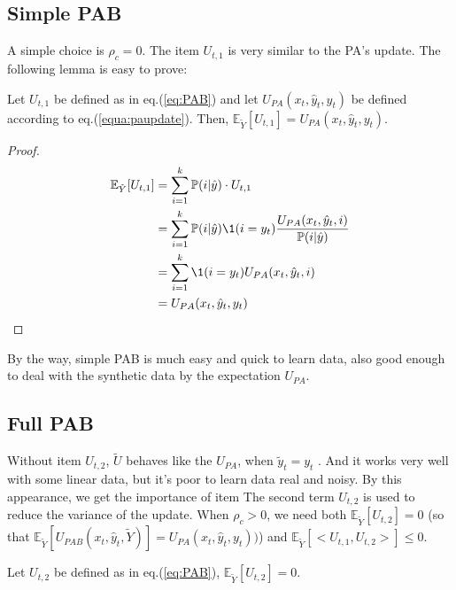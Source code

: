 
\subsection{Simple PAB}
\label{subsec:SPAB}
A simple choice is $\rho_c = 0$. 
The item $U_{t,1}$ is very similar to the PA's update. The following lemma is easy to prove:
\begin{lema} 
\label{lema:pab1}
Let $U_{t,1}$ be  defined as in eq.(\ref{eq:PAB}) and let $U_{PA}(x_t,\hat{y}_t,y_t)$ 
be defined according to eq.(\ref{equa:paupdate}). Then, $\mathbb{E}_{\tilde{Y}}[U_{t,1}]=U_{PA}(x_t,\hat{y}_t,y_t)$.
\end{lema}
\begin{proof}
\begin{align*}
\mathbb{E}_{\tilde{Y}}[U_{t,1}] &= \sum_{i=1}^{k}  \mathbb{P}(i|\hat{y})\cdot U_{t,1}\\
&=\sum_{i=1}^{k}\mathbb{P}(i|\hat{y})\1(i=y_t)\frac{U_{PA}(x_t,\hat{y}_t,i)}{\mathbb{P}(i|\hat{y})}\\
&=\sum_{i=1}^{k} \1(i=y_t)U_{PA}(x_t,\hat{y}_t,i) \\
&=U_{PA}(x_t,\hat{y}_t,y_t)
\end{align*}
\end{proof}
By the way, simple PAB is much easy and quick to learn data, also good enough to deal with the synthetic data by the expectation $U_{PA}$. 

\subsection{Full PAB}
\label{subsec:FPAB}
Without item $U_{t,2}$,  $\tilde{U}$ behaves like the $U_{PA}$, when $\tilde{y}_t = y_t$ . 
And it works very well with some linear data, but it's poor to learn data real and noisy. By this appearance, we get  the importance of item  
The second term $U_{t,2}$ is used to reduce the variance of the update.
When $\rho_c > 0$, we need both $\mathbb{E}_{\tilde{Y}}[U_{t,2}] = 0$ (so that $\mathbb{E}_{\tilde{Y}}[{U}_{PAB}(x_t,\hat{y}_t,\tilde{Y})] = U_{PA}(x_t,\hat{y}_t,y_t))$) and  $\mathbb{E}_{\tilde{Y}}[<U_{t,1},U_{t,2}>] \leq 0$.  

\begin{lema} 
\label{lema:pab2}
Let $U_{t,2}$ be defined as in eq.(\ref{eq:PAB}),  $\mathbb{E}_{\tilde{Y}}[U_{t,2}]=0$.
\end{lema}

